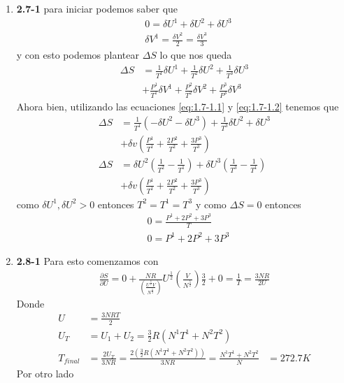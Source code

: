 \documentclass[12pt]{exam}
\begin{document}
\begin{enumerate}
	\item \textbf{2.7-1} para iniciar podemos saber que 
		\begin{align}
			&0 = \delta U^1 + \delta U^2 + \delta U^3 \label{eq:1.7-1.1}\\
			&\delta V^1 = \frac{\delta V^2}{2} = \frac{\delta V^3}{3} \label{eq:1.7-1.2} 
		\end{align}
		y con esto podemos plantear $\Delta S$ lo que nos queda
		\begin{align*}
			\Delta S &= \frac{1}{T^1}\delta U^1 + \frac{1}{T^2}\delta U^2 + \frac{1}{T^3}\delta U^3\\
			&+\frac{P^1}{T^1}\delta V^1 + \frac{P^2}{T^2} \delta V^2 + \frac{P^3}{P^3}\delta V^3
		\end{align*}
		Ahora bien, utilizando las ecuaciones \ref{eq:1.7-1.1} y \ref{eq:1.7-1.2} tenemos que
		\begin{align*}
			\Delta S &= \frac{1}{T^1}(-\delta U^2 - \delta U^3) + \frac{1}{T^3}\delta U^2 + \delta U^3\\
			&+\delta v(\frac{P^1}{T^1}+\frac{2P^2}{T^2}+\frac{3P^3}{T^3})\\
			\Delta S &= \delta U^2(\frac{1}{T^2}-\frac{1}{T^1})+\delta U^3(\frac{1}{T^3}-\frac{1}{T^1})\\
			&+\delta v(\frac{P^1}{T^1}+\frac{2P^2}{T^2}+\frac{3P^3}{T^3})
		\end{align*}
		como $\delta U^1,\delta U^2 > 0$ entonces $T^2 = T^1 = T^3$ y como $\Delta S = 0$ entonces
		\begin{align*}
			&0 = \frac{P^1+2P^2+3P^3}{T}\\
			&0 = P^1 + 2P^2 + 3P^3
		\end{align*}
	\item \textbf{2.8-1} Para esto comenzamos con 
		\begin{align*}
			\frac{\partial S}{\partial U} = 0 + \frac{NR}{\left(\frac{U^{\frac{3}{2}}V}{N^{\frac{5}{2}}}\right)}U^{\frac{1}{2}}\left(\frac{V}{N^{\frac{5}{2}}}\right)\frac{3}{2}+ 0= \frac{1}{T} = \frac{3NR}{2U}
		\end{align*}
	Donde
		\begin{align*}
			U &= \frac{3NRT}{2}\\
			U_T &= U_1 + U_2 = \frac{3}{2}R(N^{1}T^1+N^2T^2)\\
			T_{final} &= \frac{2U_T}{3NR}= \frac{2(\frac{3}{2}R(N^{1}T^1+N^2T^2))}{3NR}=\frac{N^1T^1+N^2T^2}{N}
			&= 272.7 K
		\end{align*}
		Por otro lado
		\begin{align*}

\end{align*}
\end{enumerate}
\end{document}
